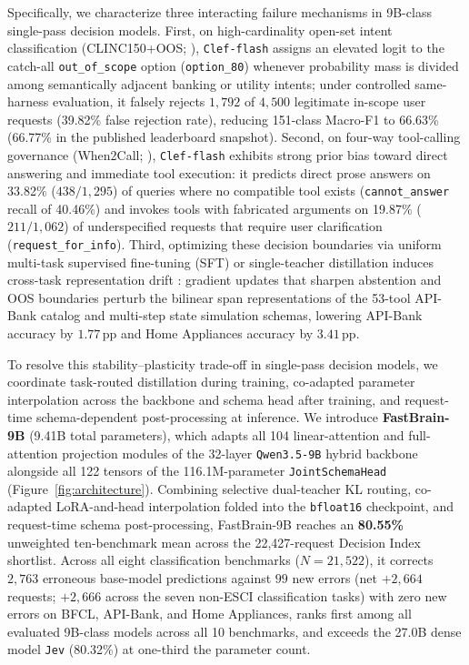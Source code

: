 \documentclass[10pt,twocolumn]{article}
\begin{document}
Specifically, we characterize three interacting failure mechanisms in 9B-class single-pass decision models. First, on high-cardinality open-set intent classification (CLINC150+OOS; \citealp{larson2019clinc150}), \texttt{Clef-flash} assigns an elevated logit to the catch-all \texttt{out\_of\_scope} option (\texttt{option\_80}) whenever probability mass is divided among semantically adjacent banking or utility intents; under controlled same-harness evaluation, it falsely rejects $1{,}792$ of $4{,}500$ legitimate in-scope user requests (39.82\% false rejection rate), reducing 151-class Macro-F1 to 66.63\% (66.77\% in the published leaderboard snapshot). Second, on four-way tool-calling governance (When2Call; \citealp{ross2025when2call}), \texttt{Clef-flash} exhibits strong prior bias toward direct answering and immediate tool execution: it predicts direct prose answers on 33.82\% ($438/1{,}295$) of queries where no compatible tool exists (\texttt{cannot\_answer} recall of 40.46\%) and invokes tools with fabricated arguments on 19.87\% ($211/1{,}062$) of underspecified requests that require user clarification (\texttt{request\_for\_info}). Third, optimizing these decision boundaries via uniform multi-task supervised fine-tuning (SFT) or single-teacher distillation induces cross-task representation drift \citep{ilharco2023taskarithmetic,yadav2023ties}: gradient updates that sharpen abstention and OOS boundaries perturb the bilinear span representations of the 53-tool API-Bank catalog \citep{li2023apibank} and multi-step state simulation schemas, lowering API-Bank accuracy by $1.77$\,pp and Home Appliances accuracy by $3.41$\,pp.

To resolve this stability--plasticity trade-off in single-pass decision models, we coordinate task-routed distillation during training, co-adapted parameter interpolation across the backbone and schema head after training, and request-time schema-dependent post-processing at inference. We introduce \textbf{FastBrain-9B} (9.41B total parameters), which adapts all 104 linear-attention and full-attention projection modules of the 32-layer \texttt{Qwen3.5-9B} hybrid backbone alongside all 122 tensors of the 116.1M-parameter \texttt{JointSchemaHead} (Figure~\ref{fig:architecture}). Combining selective dual-teacher KL routing, co-adapted LoRA-and-head interpolation folded into the \texttt{bfloat16} checkpoint, and request-time schema post-processing, FastBrain-9B reaches an \textbf{80.55\%} unweighted ten-benchmark mean across the 22,427-request Decision Index shortlist. Across all eight classification benchmarks ($N = 21{,}522$), it corrects $2{,}763$ erroneous base-model predictions against $99$ new errors (net $+2{,}664$ requests; $+2{,}666$ across the seven non-ESCI classification tasks) with zero new errors on BFCL, API-Bank, and Home Appliances, ranks first among all evaluated 9B-class models across all 10 benchmarks, and exceeds the 27.0B dense model \texttt{Jev} (80.32\%) at one-third the parameter count.
\end{document}
